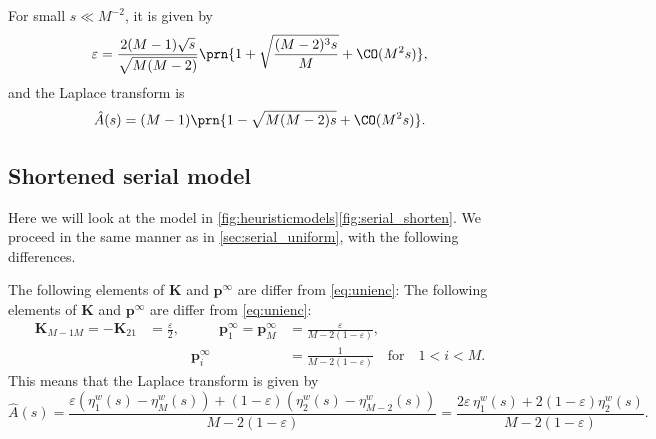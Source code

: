 \documentclass[12pt]{article}
\newcommand{\pr}{\mathbf{p}}
\newcommand{\eq}{\pr^\infty}
\newcommand{\enc}{\mathbf{K}}
\begin{document}
For small $s \ll M^{-2}$, it is given by
%
\begin{equation}\label{eq:stickyeps}
  \varepsilon = \frac{ 2(M-1)\sqrt{s} }{\sqrt{M(M-2)}} \prn{ 1 + \sqrt{\frac{(M-2)^3s}{M}} + \CO(M^2s)},  
\end{equation}
%
and the Laplace transform is 
%
\begin{equation}\label{eq:stickyenv}
  \hat{A}(s) = (M-1) \prn{ 1 - \sqrt{M(M-2)s} + \CO(M^2s)}.
\end{equation}
%



\subsection{Shortened serial model}\label{sec:serial_shorten}


Here we will look at the model in \autoref{fig:heuristicmodels}\ref{fig:serial_shorten}.
We proceed in the same manner as in \autoref{sec:serial_uniform}, with the following differences.

The following elements of $\enc$ and $\eq$ are differ from \eqref{eq:unienc}:
The following elements of $\enc$ and $\eq$ are differ from \eqref{eq:unienc}:
%
\begin{equation}\label{eq:shortenenc}
  \begin{aligned}
  \enc_{M-1M} = -\enc_{21} &= \frac{\varepsilon}{2},
  &\qquad
  \eq_1 = \eq_M &= \frac{\varepsilon}{M-2(1-\varepsilon)},
  \\ &&
  \eq_i &=  \frac{1}{M-2(1-\varepsilon)}
  \quad\text{for}\quad 1<i<M.
  \end{aligned}
\end{equation}
%
This means that the Laplace transform is given by
%
\begin{equation}\label{eq:shortenareaeta}
  \hat{A}(s) = \frac{\varepsilon(\eta^w_1(s)-\eta^w_M(s)) + (1-\varepsilon)(\eta^w_2(s)-\eta^w_{M-2}(s))}{M-2(1-\varepsilon)}
       = \frac{2\varepsilon\, \eta^w_1(s) + 2(1-\varepsilon)\eta^w_2(s)}{M-2(1-\varepsilon)}.
\end{equation}
%
\end{document}
